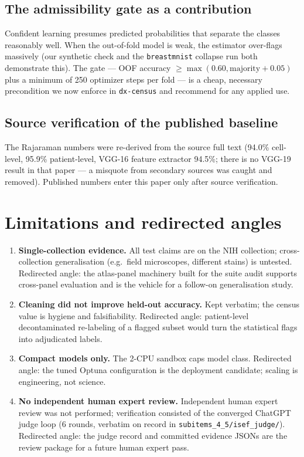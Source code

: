 \subsection{The admissibility gate as a contribution}
Confident learning presumes predicted probabilities that separate the
classes reasonably well. When the out-of-fold model is weak, the estimator
over-flags massively (our synthetic check and the \texttt{breastmnist}
collapse run both demonstrate this). The gate --- OOF accuracy
$\ge \max(0.60, \text{majority}+0.05)$ plus a minimum of 250 optimizer
steps per fold --- is a cheap, necessary precondition we now enforce in
\texttt{dx-census} and recommend for any applied use.
\subsection{Source verification of the published baseline}
The Rajaraman numbers were re-derived from the source full text
(94.0\% cell-level, 95.9\% patient-level, VGG-16 feature extractor 94.5\%;
there is no VGG-19 result in that paper --- a misquote from secondary
sources was caught and removed). Published numbers enter this paper only
after source verification.

\section{Limitations and redirected angles}
\begin{enumerate}
\item \textbf{Single-collection evidence.} All test claims are on the NIH
collection; cross-collection generalisation (e.g.\ field microscopes,
different stains) is untested. Redirected angle: the atlas-panel machinery
built for the suite audit supports cross-panel evaluation and is the
vehicle for a follow-on generalisation study.
\item \textbf{Cleaning did not improve held-out accuracy.} Kept verbatim;
the census value is hygiene and falsifiability. Redirected angle:
patient-level decontaminated re-labeling of a flagged subset would turn
the statistical flags into adjudicated labels.
\item \textbf{Compact models only.} The 2-CPU sandbox caps model class.
Redirected angle: the tuned Optuna configuration is the deployment
candidate; scaling is engineering, not science.
\item \textbf{No independent human expert review.} Independent
human expert review was not performed; verification consisted of the
converged ChatGPT judge loop (6 rounds, verbatim on record in
\texttt{subitems\_4\_5/isef\_judge/}). Redirected angle: the judge
record and committed evidence JSONs are the review package for a
future human expert pass.
\end{enumerate}
